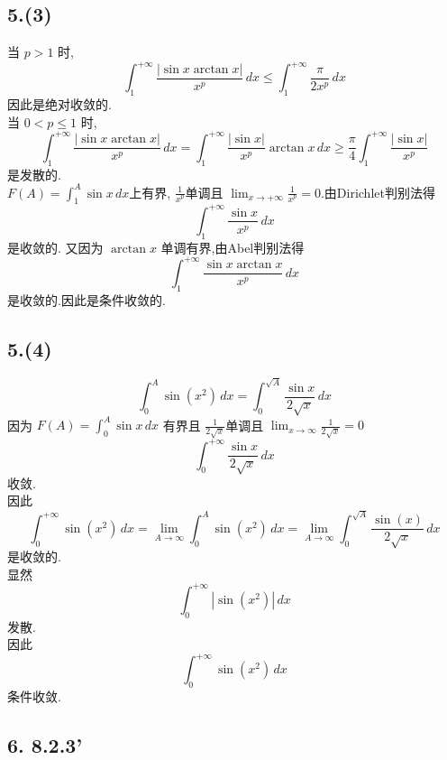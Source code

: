 \documentclass[12pt, a4paper, oneside]{ctexart}
\begin{document}
        \subsection*{5.(3)}
            当 $p > 1$ 时,
            $$
                \int_{1}^{+\infty}\frac{|\sin x\arctan x|}{x^p}\,dx\leq \int_{1}^{+\infty}\frac{\pi}{2x^p}\,dx
            $$
            因此是绝对收敛的.\\
            当 $0<p \leq 1$ 时,
            $$
                \int_{1}^{+\infty}\frac{|\sin x\arctan x|}{x^p}\,dx=\int_{1}^{+\infty}\frac{|\sin x|}{x^p}\arctan x\,dx\geq \frac{\pi}{4}\int_{1}^{+\infty}\frac{|\sin x|}{x^p}
            $$
            是发散的.\\
            $F(A)=\int_{1}^{A}\sin x\,dx$上有界, $\frac{1}{x^p}$单调且 $\lim_{x\to+\infty}\frac{1}{x^p}=0$.由Dirichlet判别法得
            $$
                \int_{1}^{+\infty}\frac{\sin x}{x^p}\,dx
            $$
            是收敛的. 又因为 $\arctan x$ 单调有界,由Abel判别法得
            $$
                \int_{1}^{+\infty}\frac{\sin x\arctan x}{x^p}\,dx
            $$
            是收敛的.因此是条件收敛的.
        \subsection*{5.(4)}
            $$
                \int_{0}^{A}\sin(x^2)\,dx=\int_{0}^{\sqrt{A}}\frac{\sin x}{2\sqrt x}\,dx
            $$
            因为 $F(A)=\int_{0}^{A}\sin x\,dx$ 有界且 $\frac{1}{2\sqrt{x}}$单调且 $\lim_{x\to \infty}\frac{1}{2\sqrt{x}}=0$
            $$
                \int_{0}^{+\infty}\frac{\sin x}{2\sqrt{x}}\,dx
            $$
            收敛.\\
            因此
            $$
                \int_{0}^{+\infty}\sin(x^2)\,dx=\lim_{A\to\infty}\int_{0}^{A}\sin(x^2)\,dx=\lim_{A\to\infty}\int_{0}^{\sqrt{A}}\frac{\sin(x)}{2\sqrt{x}}\,dx
            $$
            是收敛的.\\
            显然
            $$
                \int_{0}^{+\infty}|\sin(x^2)|\,dx
            $$
            发散.\\
            因此
            $$
                \int_{0}^{+\infty}\sin(x^2)\,dx
            $$
            条件收敛.
        \subsection*{6. 8.2.3'}
\end{document}
